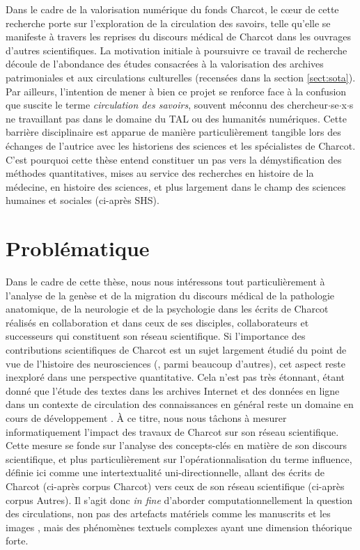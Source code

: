 Dans le cadre de la valorisation numérique du fonds Charcot, le cœur de cette recherche porte sur l’exploration de la circulation des savoirs, telle qu’elle se manifeste à travers les reprises du discours médical de Charcot dans les ouvrages d’autres scientifiques. La motivation initiale à poursuivre ce travail de recherche découle de l’abondance des études consacrées à la valorisation des archives patrimoniales et aux circulations culturelles (recensées dans la section \ref{sect:sota}). Par ailleurs, l’intention de mener à bien ce projet se renforce face à la confusion que suscite le terme \textit{circulation des savoirs}, souvent méconnu des chercheur$\cdot$se$\cdot$x$\cdot$s ne travaillant pas dans le domaine du \textsc{TAL} ou des humanités numériques.
Cette barrière disciplinaire est apparue de manière particulièrement tangible lors des échanges de l’autrice avec les historiens des sciences et les spécialistes de Charcot. C’est pourquoi cette thèse entend constituer un pas vers la démystification des méthodes quantitatives, mises au service des recherches en histoire de la médecine, en histoire des sciences, et plus largement dans le champ des sciences humaines et sociales (ci-après \og{}\textsc{SHS}\fg{}).

\section{Problématique}

Dans le cadre de cette thèse, nous nous intéressons tout particulièrement à l'analyse de la genèse et de la migration du discours médical de la pathologie anatomique, de la neurologie et de la psychologie dans les écrits de Charcot réalisés en collaboration et dans ceux de ses disciples, collaborateurs et successeurs qui constituent son \og{}réseau scientifique\fg{}. Si l'importance des contributions scientifiques de Charcot est un sujet largement étudié du point de vue de l'histoire des neurosciences (\citealp{bogousslavsky2011following,broussolle2012,camargo2024}, parmi beaucoup d'autres), cet aspect reste inexploré dans une perspective quantitative. Cela n'est pas très étonnant, étant donné que l'étude des textes dans les archives Internet et des données en ligne dans un contexte de circulation des connaissances en général reste un domaine en cours de développement \citep{milia2023}. À ce titre, nous nous tâchons à mesurer informatiquement l'impact des travaux de Charcot sur son réseau scientifique. Cette mesure se fonde sur l'analyse des concepts-clés en matière de son discours scientifique, et plus particulièrement sur l'opérationnalisation du terme \og{}influence\fg{}, définie ici comme une intertextualité uni-directionnelle, allant des écrits de Charcot (ci-après corpus \og{}Charcot\fg{}) vers ceux de son réseau scientifique (ci-après corpus \og{}Autres\fg{}). Il s'agit donc \textit{in fine} d'aborder computationnellement la question des circulations, non pas des artefacts matériels comme les manuscrits \citep{gabay2021katabase} et les images \citep{joyeux2019visual}, mais des phénomènes textuels complexes \citep{manjavacas} ayant une dimension théorique forte. 

